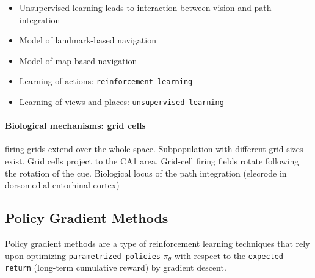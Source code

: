 \documentclass[11pt]{article}
\begin{document}
\begin{itemize}
\item Unsupervised learning leads to interaction between vision and path integration
\item Model of landmark-based navigation
\item Model of map-based navigation
\item Learning of actions: \texttt{reinforcement learning}
\item Learning of views and places: \texttt{unsupervised learning}
\end{itemize}

\paragraph{Biological mechanisms: grid cells}
firing grids extend over the whole space. Subpopulation with different grid sizes exist. Grid cells project to the CA1 area. Grid-cell firing fields rotate following the rotation of the cue.
Biological locus of the path integration (elecrode in dorsomedial entorhinal cortex)

\subsection{Policy Gradient Methods}
Policy gradient methods are a type of reinforcement learning techniques that rely upon optimizing \texttt{parametrized policies} $\pi_\theta$ with respect to the \texttt{expected return} (long-term cumulative reward) by gradient descent. %
\end{document}
